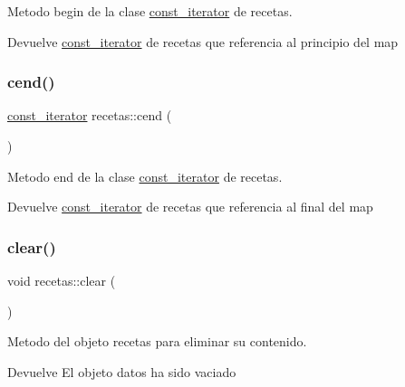 Metodo begin de la clase \hyperlink{classrecetas_1_1const__iterator}{const\+\_\+iterator} de recetas. 

\begin{DoxyReturn}{Devuelve}
\hyperlink{classrecetas_1_1const__iterator}{const\+\_\+iterator} de recetas que referencia al principio del map 
\end{DoxyReturn}
\mbox{\label{classrecetas_a4eab868b8c3259a163d6c3d3e6424b39}} 
\subsubsection{\texorpdfstring{cend()}{cend()}}
{\footnotesize\ttfamily \hyperlink{classrecetas_1_1const__iterator}{const\+\_\+iterator} recetas\+::cend (\begin{DoxyParamCaption}{ }\end{DoxyParamCaption})\hspace{0.3cm}{\ttfamily [inline]}}



Metodo end de la clase \hyperlink{classrecetas_1_1const__iterator}{const\+\_\+iterator} de recetas. 

\begin{DoxyReturn}{Devuelve}
\hyperlink{classrecetas_1_1const__iterator}{const\+\_\+iterator} de recetas que referencia al final del map 
\end{DoxyReturn}
\mbox{\label{classrecetas_a25f33192eb91a795e29261456d822dad}} 
\subsubsection{\texorpdfstring{clear()}{clear()}}
{\footnotesize\ttfamily void recetas\+::clear (\begin{DoxyParamCaption}{ }\end{DoxyParamCaption})}



Metodo del objeto recetas para eliminar su contenido. 

\begin{DoxyReturn}{Devuelve}
El objeto datos ha sido vaciado 
\end{DoxyReturn}
\mbox{\label{classrecetas_a3860f782624bed9fffb7ec4eaddee97c}} 
